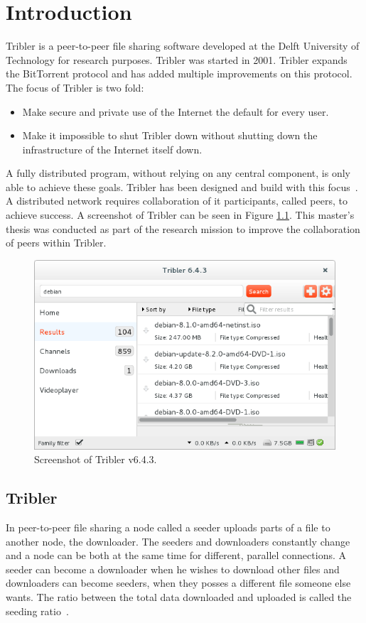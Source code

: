 \chapter{Introduction}
\label{chp:introduction}
Tribler is a peer-to-peer file sharing software developed at the Delft University of Technology for research purposes.
Tribler was started in 2001.
Tribler expands the BitTorrent protocol and has added multiple improvements on this protocol.
The focus of Tribler is two fold:
\begin{itemize}
    \item Make secure and private use of the Internet the default for every user.
    \item Make it impossible to shut Tribler down without shutting down the infrastructure of the Internet itself down.
\end{itemize}

A fully distributed program, without relying on any central component, is only able to achieve these goals.
Tribler has been designed and build with this focus~\cite{Pouwelse-tribler,Bakker-tribler}.
A distributed network requires collaboration of it participants, called peers, to achieve success.
A screenshot of Tribler can be seen in Figure \ref{fig:tribler-screenshot}.
This master's thesis was conducted as part of the research mission to improve the collaboration of peers within Tribler.

\begin{figure}
	\centerline{\includegraphics[scale=0.6]{introduction/figs/tribler-screenshot.png}}
	\caption{Screenshot of Tribler v6.4.3.}
	\label{fig:tribler-screenshot}
\end{figure}

\section{Tribler}
In peer-to-peer file sharing a node called a seeder uploads parts
of a file to another node, the downloader.
The seeders and downloaders constantly change
and a node can be both at the same time for different, parallel connections.
A seeder can become a downloader when he wishes to download other files
and downloaders can become seeders,
when they posses a different file someone else wants.
The ratio between the total data downloaded and uploaded is called the seeding ratio~\cite{Cohen-bittorrent}.

